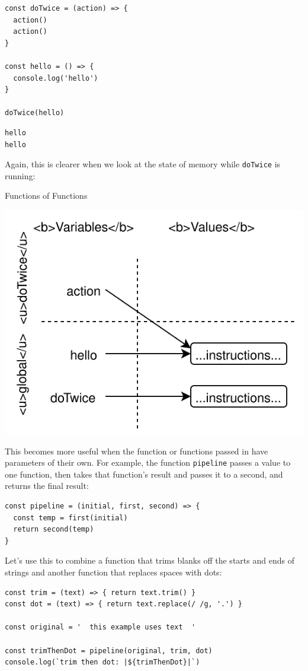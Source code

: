 \begin{verbatim}
const doTwice = (action) => {
  action()
  action()
}

const hello = () => {
  console.log('hello')
}

doTwice(hello)
\end{verbatim}

\begin{verbatim}
hello
hello
\end{verbatim}

Again, this is clearer when we look at the state of memory while
\texttt{doTwice} is running:

Functions of Functions

\includegraphics{../../files/callbacks-do-twice.svg}

This becomes more useful when the function or functions passed in have
parameters of their own. For example, the function \texttt{pipeline}
passes a value to one function, then takes that function's result and
passes it to a second, and returns the final result:

\begin{verbatim}
const pipeline = (initial, first, second) => {
  const temp = first(initial)
  return second(temp)
}
\end{verbatim}

Let's use this to combine a function that trims blanks off the starts
and ends of strings and another function that replaces spaces with dots:

\begin{verbatim}
const trim = (text) => { return text.trim() }
const dot = (text) => { return text.replace(/ /g, '.') }

const original = '  this example uses text  '

const trimThenDot = pipeline(original, trim, dot)
console.log(`trim then dot: |${trimThenDot}|`)
\end{verbatim}

